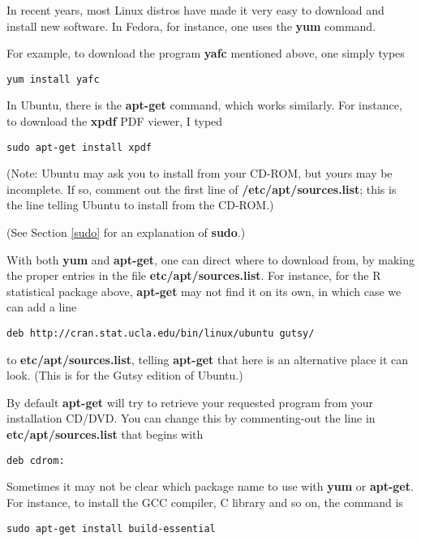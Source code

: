 \documentclass[11pt]{article}
\begin{document}
In recent years, most Linux distros have made it very easy to download
and install new software.  In Fedora, for instance, one uses the {\bf
yum} command.

For example, to download the program {\bf yafc} mentioned above, one
simply types

\begin{verbatim}
yum install yafc
\end{verbatim}

In Ubuntu, there is the {\bf apt-get} command, which works similarly.
For instance, to download the {\bf xpdf} PDF viewer, I typed

\begin{Verbatim}[fontsize=\relsize{-2}]
sudo apt-get install xpdf
\end{Verbatim}

(Note:  Ubuntu may ask you to install from your CD-ROM, but yours may be
incomplete.  If so, comment out the first line of {\bf
/etc/apt/sources.list}; this is the line telling Ubuntu to install from
the CD-ROM.)

(See Section \ref{sudo} for an explanation of {\bf sudo}.)

With both {\bf yum} and {\bf apt-get}, one can direct where to download
from, by making the proper entries in the file {\bf
etc/apt/sources.list}.  For instance, for the R statistical package
above, {\bf apt-get} may not find it on its own, in which case we can
add a line

\begin{Verbatim}[fontsize=\relsize{-2}]
deb http://cran.stat.ucla.edu/bin/linux/ubuntu gutsy/ 
\end{Verbatim}

to {\bf etc/apt/sources.list}, telling {\bf apt-get} that here is an
alternative place it can look.  (This is for the Gutsy edition of
Ubuntu.)

By default {\bf apt-get} will try to retrieve your requested program
from your installation CD/DVD.  You can change this by commenting-out
the line in {\bf etc/apt/sources.list} that begins with

\begin{Verbatim}[fontsize=\relsize{-2}]
deb cdrom:
\end{Verbatim}

Sometimes it may not be clear which package name to use with {\bf yum}
or {\bf apt-get}.  For instance, to install the GCC compiler, C library
and so on, the command is

\begin{Verbatim}[fontsize=\relsize{-2}]
sudo apt-get install build-essential
\end{Verbatim}
\end{document}
